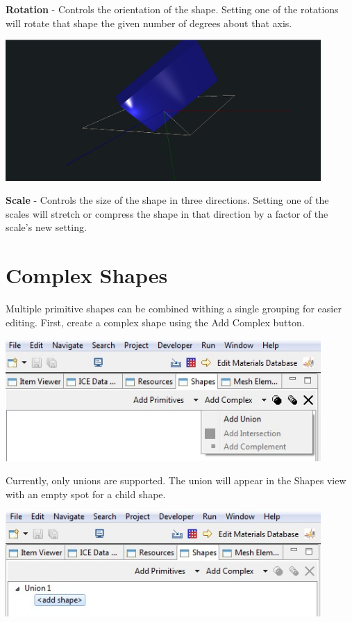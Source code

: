 \documentclass{article}
\begin{document}
\textbf{Rotation} - Controls the orientation of the shape. Setting one of the
rotations will rotate that shape the given number of degrees about that axis.

\begin{center}
\includegraphics[width=12cm]{images/GeometryCubeScale.jpg}
\end{center}

\textbf{Scale} - Controls the size of the shape in three directions. Setting one
of the scales will stretch or compress the shape in that direction by a factor
of the scale's new setting.

\section{Complex Shapes}

Multiple primitive shapes can be combined withing a single grouping for easier
editing. First, create a complex shape using the Add Complex button. 

\begin{center}
\includegraphics[width=12cm]{images/GeometryAddComplex.jpg}
\end{center}

Currently, only unions are supported. The union will appear in the Shapes view
with an empty spot for a child shape. 

\begin{center}
\includegraphics[width=12cm]{images/GeometryUnionAddShape.jpg}
\end{center}
\end{document}
